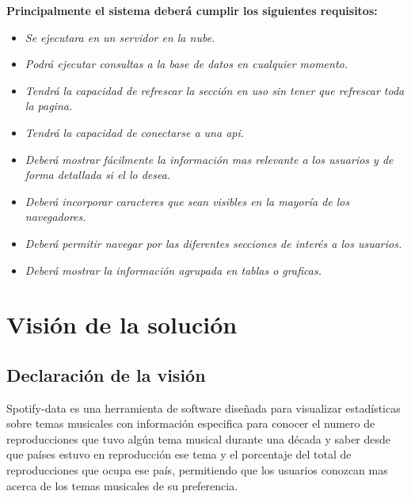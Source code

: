 \documentclass[12pt,a4paper]{book}
\begin{document}
\textbf{Principalmente el sistema deberá cumplir los siguientes requisitos: }
\vspace{0.5 cm}
\begin{itemize}
\item \textit{Se ejecutara en un servidor en la nube.}
\item \textit{Podrá ejecutar consultas a la base de datos en cualquier momento.}
\item \textit{Tendrá la capacidad de refrescar la sección en uso sin tener que refrescar toda la pagina.}
\item \textit{Tendrá la capacidad de conectarse a una api.}
\item \textit{Deberá mostrar fácilmente la información mas relevante a los usuarios y de forma detallada si el lo desea.}
\item \textit{Deberá incorporar caracteres que sean visibles en la mayoría de los navegadores.}
\item \textit{Deberá permitir navegar por las diferentes secciones de interés a los usuarios.}
\item \textit{Deberá mostrar la información agrupada en tablas o graficas.}
\end{itemize}

\chapter{Visión de la solución}

\section{Declaración de la visión}
\vspace{0.5 cm}
Spotify-data es una herramienta de software diseñada para visualizar estadísticas sobre temas musicales con información especifica para conocer el numero de reproducciones que tuvo algún tema musical durante una década y saber desde que países estuvo en reproducción ese tema y el porcentaje del total de reproducciones que ocupa ese país, permitiendo que los usuarios conozcan mas acerca de los temas musicales de su preferencia.
\end{document}
